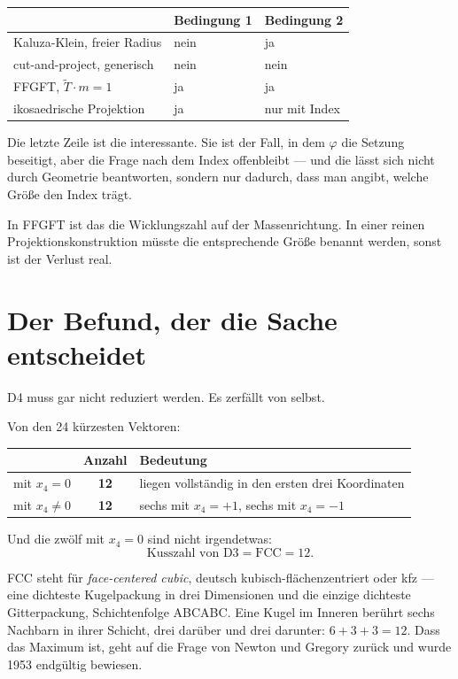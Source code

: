 \begin{center}
\begin{tabular}{lll}
\toprule
 & Bedingung 1 & Bedingung 2 \\
\midrule
Kaluza-Klein, freier Radius & nein & ja \\
cut-and-project, generisch & nein & nein \\
FFGFT, $\tilde T \cdot m = 1$ & ja & ja \\
ikosaedrische Projektion & ja & nur mit Index \\
\bottomrule
\end{tabular}
\end{center}

Die letzte Zeile ist die interessante. Sie ist der Fall, in dem
$\varphi$ die Setzung beseitigt, aber die Frage nach dem Index
offenbleibt --- und die lässt sich nicht durch Geometrie beantworten,
sondern nur dadurch, dass man angibt, welche Größe den Index trägt.

In FFGFT ist das die Wicklungszahl auf der Massenrichtung. In einer
reinen Projektionskonstruktion müsste die entsprechende Größe benannt
werden, sonst ist der Verlust real.

\chapter{Der Befund, der die Sache entscheidet}

D4 muss gar nicht reduziert werden. Es zerfällt von selbst.

Von den 24 kürzesten Vektoren:
\begin{center}
\begin{tabular}{lcl}
\toprule
 & Anzahl & Bedeutung \\
\midrule
mit $x_4 = 0$ & \textbf{12} & liegen vollständig in den ersten drei Koordinaten \\
mit $x_4 \neq 0$ & \textbf{12} & sechs mit $x_4 = +1$, sechs mit $x_4 = -1$ \\
\bottomrule
\end{tabular}
\end{center}

Und die zwölf mit $x_4 = 0$ sind nicht irgendetwas:
\[
  \text{Kusszahl von D3} = \text{FCC} = 12 .
\]

FCC steht für \emph{face-centered cubic}, deutsch
kubisch-flächenzentriert oder kfz --- eine dichteste Kugelpackung in
drei Dimensionen und die einzige dichteste Gitterpackung, Schichtenfolge ABCABC. Eine Kugel im Inneren berührt
sechs Nachbarn in ihrer Schicht, drei darüber und drei darunter:
$6 + 3 + 3 = 12$. Dass das Maximum ist, geht auf die Frage von Newton
und Gregory zurück und wurde 1953 endgültig bewiesen.

